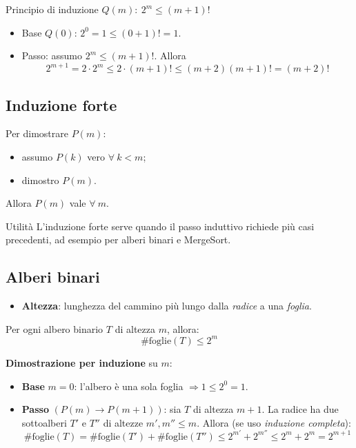 \documentclass{article}
\begin{document}
\begin{ex}{Principio di induzione}{}
$Q(m):\ 2^m \le (m+1)!$
\begin{itemize}
    \item Base $Q(0)$: $2^0=1\le (0+1)!=1$.
    \item Passo: assumo $2^m\le (m+1)!$. Allora
    \[
    2^{m+1}=2\cdot 2^m \le 2\cdot (m+1)! \le (m+2)(m+1)!=(m+2)!
    \]
\end{itemize}
\end{ex}

\subsection{Induzione forte}

Per dimostrare $P(m)$:
\begin{itemize}
    \item assumo $P(k)$ vero $\forall\ k<m$;
    \item dimostro $P(m)$.
\end{itemize}
Allora $P(m)$ vale $\forall\ m$.

\begin{note}{Utilità}{}
L'induzione forte serve quando il passo induttivo richiede più casi precedenti, ad esempio per alberi binari e MergeSort.
\end{note}

\subsection{Alberi binari}

\begin{itemize}
    \item \textbf{Altezza}: lunghezza del cammino più lungo dalla \emph{radice} a una \emph{foglia}.
\end{itemize}

\begin{theo}{}{}
Per ogni albero binario $T$ di altezza $m$, allora:
\[
\#\text{foglie}(T)\le 2^m
\]
\end{theo}

\textbf{Dimostrazione per induzione} su $m$:
\begin{itemize}
    \item \textbf{Base} $m=0$: l'albero è una sola foglia $\Rightarrow 1\le 2^0=1$.
    \item \textbf{Passo} $(P(m)\to P(m+1))$: sia $T$ di altezza $m+1$. La radice ha due sottoalberi $T'$ e $T''$ di altezze $m',m''\le m$. Allora (se uso \emph{induzione completa}):
    \[
    \#\text{foglie}(T)
    =\#\text{foglie}(T')+\#\text{foglie}(T'')
    \le 2^{m'}+2^{m''}
    \le 2^m+2^m
    =2^{m+1}
    \]
\end{itemize}
\end{document}

